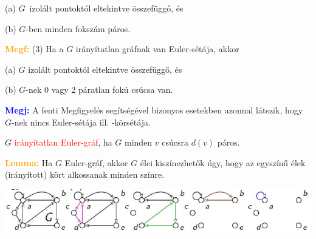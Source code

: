 \documentclass[../szamtud.tex]{subfiles}
\begin{document}
            (a) $G$ izolált pontoktól eltekintve összefüggő, és

            (b) $G$-ben minden fokszám páros.


        \textcolor{orange}{\textbf{Megf:}} (3) Ha a $G$ irányítatlan gráfnak van Euler-sétája, akkor 

            (a) $G$ izolált pontoktól eltekintve összefüggő, és

            (b) $G$-nek 0 vagy 2 páratlan fokú csúcsa van.


        \textcolor{blue}{\textbf{Megj:}} A fenti Megfigyelés segítségével bizonyos esetekben azonnal látszik, hogy $G$-nek nincs Euler-sétája ill. -körsétája.

        $G$ \textcolor{red}{irányítatlan Euler-gráf}, ha $G$ minden $v$ csúcsra $d(v)$ páros.

        \textcolor{orange}{\textbf{Lemma:}} Ha $G$ Euler-gráf, akkor $G$ élei kiszínezhetők úgy, hogy az egyszínű élek (irányított) kört alkossanak minden színre.

        \includegraphics[width=\textwidth]{img/2.png}

\end{document}
